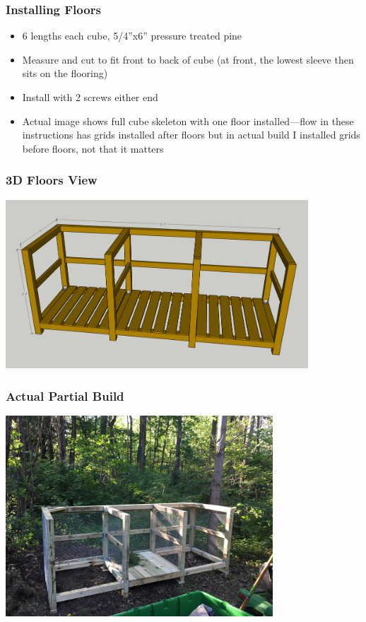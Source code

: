 \documentclass{beamer}
\begin{document}
\begin{frame}
  \frametitle{Installing Floors}
  \begin{itemize}
  \item 6 lengths each cube, 5/4''x6'' pressure treated pine
  \item Measure and cut to fit front to back of cube (at front, the lowest sleeve then sits on the flooring)
    \item Install with 2 screws either end
  \item Actual image shows full cube skeleton with one floor installed---flow in these instructions has grids installed after floors but in actual build I installed grids before floors, not that it matters
  \end{itemize}
\end{frame}

\begin{frame}
  \frametitle{3D Floors View}
  \begin{center}
    \includegraphics[width=0.85\textwidth]{images/FullCubesWFloor.png}
  \end{center}
\end{frame}

\begin{frame}
  \frametitle{Actual Partial Build}
  \begin{center}
      \includegraphics[width=0.75\textwidth]{images/actual_partial.JPG}
  \end{center}
\end{frame}
\end{document}

